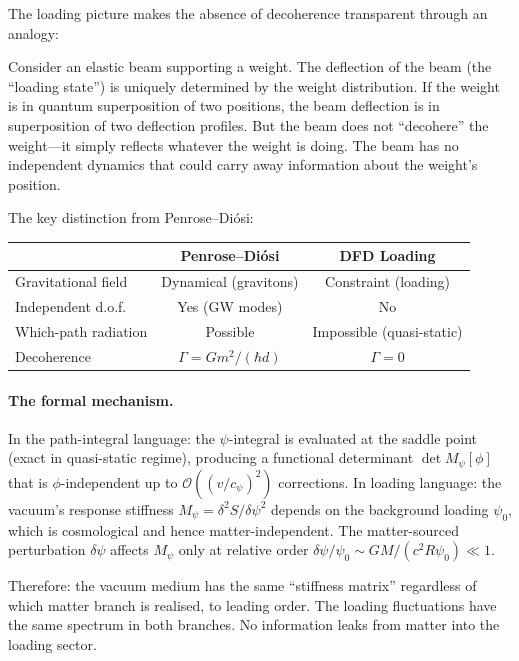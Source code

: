 \documentclass[11pt,a4paper]{article}
\newcommand{\order}{\mathcal{O}}
\begin{document}
The loading picture makes the absence of decoherence transparent through
an analogy:

Consider an elastic beam supporting a weight.  The deflection of the beam
(the ``loading state'') is uniquely determined by the weight distribution.
If the weight is in quantum superposition of two positions, the beam
deflection is in superposition of two deflection profiles.  But the beam
does not ``decohere'' the weight---it simply reflects whatever the weight
is doing.  The beam has no independent dynamics that could carry away
information about the weight's position.

The key distinction from Penrose--Di\'osi:
\begin{center}
\begin{tabular}{lcc}
\toprule
& \textbf{Penrose--Di\'osi} & \textbf{DFD Loading} \\
\midrule
Gravitational field & Dynamical (gravitons) & Constraint (loading) \\
Independent d.o.f.\ & Yes (GW modes) & No \\
Which-path radiation & Possible & Impossible (quasi-static) \\
Decoherence & $\Gamma = Gm^2/(\hbar d)$ & $\Gamma = 0$ \\
\bottomrule
\end{tabular}
\end{center}

\paragraph{The formal mechanism.}
In the path-integral language: the $\psi$-integral is evaluated at the
saddle point (exact in quasi-static regime), producing a functional
determinant $\det M_\psi[\phi]$ that is $\phi$-independent up to
$\order((v/c_\psi)^2)$ corrections.  In loading language: the vacuum's
response stiffness $M_\psi = \delta^2 S/\delta\psi^2$ depends on the
background loading $\psi_0$, which is cosmological and hence
matter-independent.  The matter-sourced perturbation $\delta\psi$ affects
$M_\psi$ only at relative order $\delta\psi/\psi_0 \sim GM/(c^2 R\psi_0)
\ll 1$.

Therefore: the vacuum medium has the same ``stiffness matrix'' regardless
of which matter branch is realised, to leading order.  The loading
fluctuations have the same spectrum in both branches.  No information
leaks from matter into the loading sector.
\end{document}
